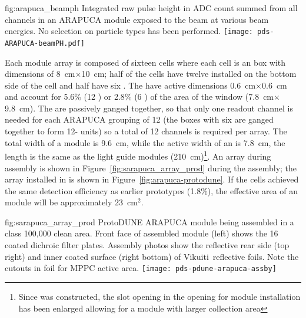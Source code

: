 \begin{dunefigure}{fig:arapuca_beamph}
{Integrated raw pulse height in ADC count summed from all channels in an ARAPUCA module exposed to the beam at various beam energies. No selection on particle types has been performed.}
	\texttt{[image: pds-ARAPUCA-beamPH.pdf]}
\end{dunefigure}

Each   module array is composed of sixteen cells where each cell is an  box with dimensions of \SI{8}{cm}$\times$\SI{10}{cm}; half of the cells have twelve  installed on the bottom side of the cell and  half have six . The  have active dimensions \SI{0.6}{cm}$\times$\SI{0.6}{cm} and account for 5.6\% (\num{12} ) or \num{2.8}\% (\num{6} ) of the area of the window (\SI{7.8}{cm}$\times$\SI{9.8}{cm}).
The   are passively ganged together, so that only one readout channel is needed for each ARAPUCA grouping of \num{12}  (the boxes with six  are ganged together to form \num{12}- units) so a total of \num{12} channels is required per array. 
The total width of a module is \SI{9.6}{cm}, while the active width of an  is \SI{7.8}{cm}, the length is the same as the light guide modules (\SI{210}{cm})\footnote{Since  was constructed, the slot opening in the  opening for  module installation has been enlarged allowing for a module with larger collection area}.
An  array during assembly is shown in Figure~\ref{fig:sarapuca_array_prod} during the assembly; the array installed in  is shown in Figure~\ref{fig:arapuca-protodune}. If the  cells achieved the same detection efficiency as earlier prototypes (1.8\%), the effective area of an  module will be approximately \SI{23}{cm$^2$}.

\begin{dunefigure}{fig:sarapuca_array_prod}
{ProtoDUNE ARAPUCA module being assembled in a class 100,000 clean area.  Front face of assembled module (left) shows the 16 coated dichroic filter plates.  Assembly photos show the reflective rear side (top right) and inner coated surface (right bottom) of Vikuiti\texttrademark\ reflective foils.  Note the cutouts in foil for MPPC active area.}
	\texttt{[image: pds-pdune-arapuca-assby]}
\end{dunefigure}

